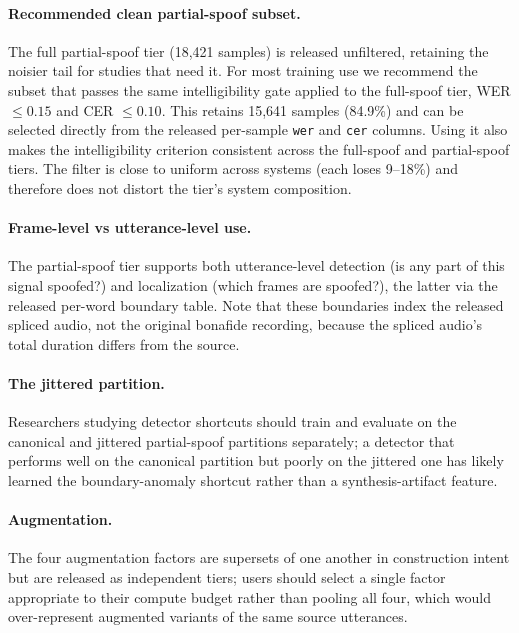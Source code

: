 \documentclass[11pt]{article}
\begin{document}
\paragraph{Recommended clean partial-spoof subset.} The full partial-spoof
tier (18{,}421 samples) is released unfiltered, retaining the noisier
tail for studies that need it. For most training use we recommend the
subset that passes the same intelligibility gate applied to the
full-spoof tier, WER $\leq 0.15$ and CER $\leq 0.10$. This retains
15{,}641 samples (84.9\%) and can be selected directly from the released
per-sample \texttt{wer} and \texttt{cer} columns. Using it also makes the
intelligibility criterion consistent across the full-spoof and
partial-spoof tiers. The filter is close to uniform across systems
(each loses 9--18\%) and therefore does not distort the tier's system
composition.

\paragraph{Frame-level vs utterance-level use.} The partial-spoof tier
supports both utterance-level detection (is any part of this signal
spoofed?) and localization (which frames are spoofed?), the latter via
the released per-word boundary table. Note that these boundaries index
the released spliced audio, not the original bonafide recording, because
the spliced audio's total duration differs from the source.

\paragraph{The jittered partition.} Researchers studying detector
shortcuts should train and evaluate on the canonical and jittered
partial-spoof partitions separately; a detector that performs well on the
canonical partition but poorly on the jittered one has likely learned the
boundary-anomaly shortcut rather than a synthesis-artifact feature.

\paragraph{Augmentation.} The four augmentation factors are supersets of
one another in construction intent but are released as independent tiers;
users should select a single factor appropriate to their compute budget
rather than pooling all four, which would over-represent augmented
variants of the same source utterances.
\end{document}
